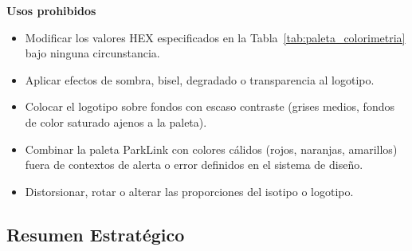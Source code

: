 \vspace{0.4cm}

\begin{mdframed}[backgroundcolor=plgray, linecolor=midgray, linewidth=0.6pt,
  innertopmargin=10pt, innerbottommargin=10pt,
  innerleftmargin=14pt, innerrightmargin=14pt]
\textbf{Usos prohibidos}
\begin{itemize}
  \item Modificar los valores HEX especificados en la Tabla~\ref{tab:paleta_colorimetria} bajo ninguna circunstancia.
  \item Aplicar efectos de sombra, bisel, degradado o transparencia al logotipo.
  \item Colocar el logotipo sobre fondos con escaso contraste (grises medios, fondos de color saturado ajenos a la paleta).
  \item Combinar la paleta ParkLink con colores cálidos (rojos, naranjas, amarillos) fuera de contextos de alerta o error definidos en el sistema de diseño.
  \item Distorsionar, rotar o alterar las proporciones del isotipo o logotipo.
\end{itemize}
\end{mdframed}

\subsection{Resumen Estratégico}

